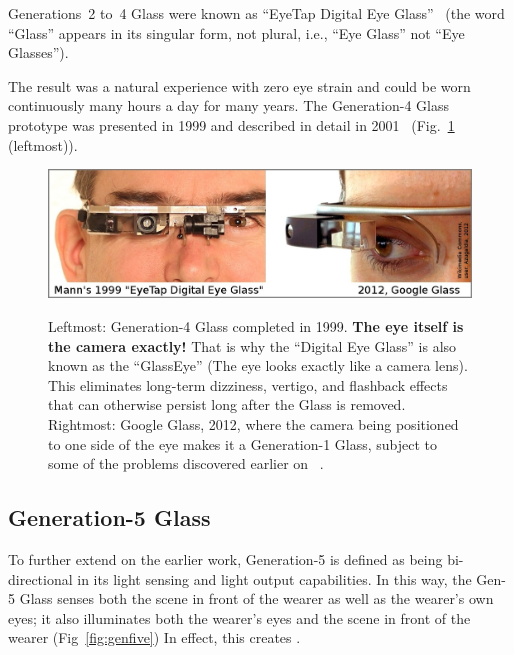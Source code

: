 Generations~2 to~4 Glass were known as ``EyeTap Digital Eye Glass''~\cite{edeg} (the word ``Glass'' 
appears in its singular form, not plural, i.e., ``Eye Glass'' not ``Eye Glasses'').

The result was a natural experience with zero eye strain and could be worn continuously many hours 
a day for many years. The Generation-4 Glass prototype was presented in 1999 and described in 
detail in 2001~\cite{intelligentimageprocessing} (Fig.~\ref{fig:mann_glass_google} (leftmost)).

\begin{figure}
  \centering
  \includegraphics[width=5.5in]{ch6/figs/MannGlass_GoogleGlass_with_narrowborder_closer.jpg}\\
  \caption{Leftmost: Generation-4 Glass completed in 1999.
         {\bf The eye itself is the camera exactly!}
         That is why the ``Digital Eye Glass'' is also known as
         the ``GlassEye'' (The eye looks exactly like a camera lens).  This
         eliminates long-term dizziness, vertigo, and flashback effects
         that can otherwise persist long after the Glass is removed.
         Rightmost: Google Glass, 2012, where the camera being positioned to one
         side of the eye makes it a Generation-1 Glass, subject to some
         of the problems discovered earlier on ~\protect\cite{mann2013vision}.
        }
  \label{fig:mann_glass_google}
\end{figure}

\subsection{Generation-5 Glass}
To further extend on the earlier work, Generation-5 is defined as being bi-directional in its light sensing 
and light output capabilities.  In this way, the Gen-5 Glass senses both the scene in front of the wearer 
as well as the wearer's
own eyes; it also illuminates both the wearer's eyes and the scene in front of the wearer 
(Fig~\ref{fig:genfive})
In effect, this creates . 

